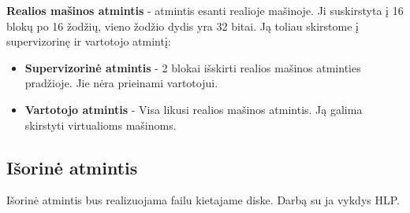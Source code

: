 \documentclass[12pt]{article}
\begin{document}
	\textbf{Realios mašinos atmintis} - atmintis esanti realioje mašinoje. Ji suskirstyta į 16 blokų po 16 žodžių, vieno žodžio dydis yra 32 bitai. Ją toliau skirstome į supervizorinę ir vartotojo atmintį:
	\begin{itemize}
	\item \textbf{Supervizorinė atmintis} - 2 blokai išskirti realios mašinos atminties pradžioje. Jie nėra prieinami vartotojui.
	\item \textbf{Vartotojo atmintis} - Visa likusi realios mašinos atmintis. Ją galima skirstyti virtualioms mašinoms.
	\end{itemize}
	
	\subsection{Išorinė atmintis}
	Išorinė atmintis bus realizuojama failu kietajame diske. Darbą su ja vykdys HLP.
\end{document}
